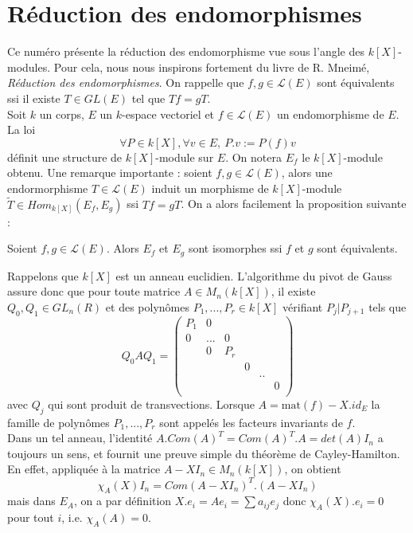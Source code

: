 \section{Réduction des endomorphismes}

Ce numéro présente la réduction des endomorphisme vue sous l'angle des $k[X]$-modules. Pour cela, nous nous inspirons fortement du livre de R. Mneimé, \textit{Réduction des endomorphismes}\cite{mneimnereduction}. On rappelle que $f,g\in \mathcal L(E)$ sont équivalents ssi il existe $T\in GL(E)$ tel que $Tf=gT$.\\

Soit $k$ un corps, $E$ un $k$-espace vectoriel et $f\in \mathcal L(E)$ un endomorphisme de $E$. La loi
\[\forall P\in k[X],\forall v\in E, \ P.v :=P(f)v\]
définit une structure de $k[X]$-module sur $E$. On notera $E_f$ le $k[X]$-module obtenu. Une remarque importante : soient $f,g\in \mathcal L(E)$, alors une endormorphisme $T\in \mathcal L(E)$ induit un morphisme de $k[X]$-module $\tilde T\in Hom_{k[X]}(E_f,E_g)$ ssi $Tf=gT$. On a alors facilement la proposition suivante :

\begin{prop}
Soient $f,g\in \mathcal L(E)$. Alors $E_f$ et $E_g$ sont isomorphes ssi $f$ et $g$ sont équivalents.
\end{prop}

Rappelons que $k[X]$ est un anneau euclidien. L'algorithme du pivot de Gauss assure donc que pour toute matrice $A\in M_n(k[X])$, il existe $Q_0,Q_1\in GL_n(R)$ et des polynômes $P_1,...,P_r\in k[X]$ vérifiant $P_j|P_{j+1}$ tels que 
\[Q_0AQ_1= \begin{pmatrix} 
P_1 & 0 &     &   &  & \\
0 &... & 0    &   &  & \\
  &   0  & P_r &   &  & \\
  &    &      & 0 &  &  \\
  &    &      &   & ..  &  \\
  &    &      &    &  & 0\\
\end{pmatrix}\]
avec $Q_j$ qui sont produit de transvections. Lorsque $A = \text{mat}(f)-X.id_E$ la famille de polynômes $P_1,...,P_r$ sont appelés les facteurs invariants de $f$.\\

Dans un tel anneau, l'identité $A.Com(A)^T = Com(A)^T . A = det(A)I_n$ a toujours un sens, et fournit une preuve simple du théorème de Cayley-Hamilton. En effet, appliquée à la matrice $A-XI_n\in M_n(k[X])$, on obtient 
\[\chi_A(X) I_n = Com(A-XI_n)^T . (A-XI_n)\]
mais dans $E_A$, on a par définition $X.e_i=Ae_i = \sum a_{ij}e_j$ donc $\chi_A(X).e_i=0$ pour tout $i$, i.e. $\chi_A(A)=0$.\\ 

